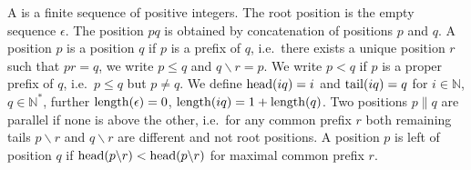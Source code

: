 
\begin{definition}\label{def:position}
	A  is a finite sequence of positive integers.
	The root position is the empty sequence \( \epsilon \).
	The position \( pq \) is obtained by concatenation of positions \( p \) and \( q \).
	A position \( p \) is  a position \( q \) if \( p \) is a prefix of \( q \),
	i.e.~there exists a unique position \( r \) such that \( pr = q \),
	we write \( p\leq q \) and \( q\backslash r = p \).
	We write \( p<q \) if \( p \) is a proper prefix of \( q \), i.e.~\( p\leq q \) but \( p\neq q \).
	We define
	\( \operatorname{head}(iq)=i \) and
	\( \operatorname{tail}(iq) = q \)
	for \( i\in\mathbb{N} \),
	\( q\in\mathbb{N}^* \),
	further
	\( \operatorname{length}(\epsilon)=0 \),
	\( \operatorname{length}(iq) = 1 + \operatorname{length}(q) \).
%
	Two positions \( p\parallel q \) are parallel if none is above the other,
	i.e.~for any common prefix \( r \) both remaining tails
	\( p\backslash r \) and \( q\backslash r \) are different and not root positions.
	A position \( p \) is left of position \( q \) if \( \operatorname{head}(p\backslash r) < \operatorname{head}(p\backslash r) \)
	for maximal common prefix \( r \).

\end{definition}
